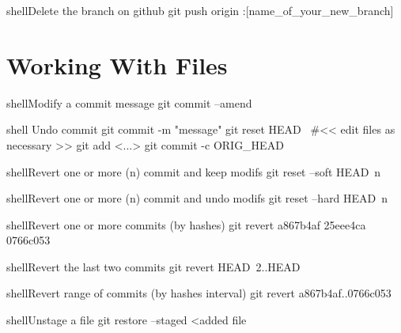 \documentclass[10pt,a4paper]{article}
\begin{document}
\begin{multicols}{3}
\begin{codebox}{shell}{Delete the branch on github}
git push origin :[name_of_your_new_branch]

\end{codebox}

\section{Working With Files}

\begin{codebox}{shell}{Modify a commit message}
git commit --amend

\end{codebox}

\begin{codebox}{shell}{}
Undo commit
git commit -m "message"
git reset HEAD~
#<< edit files as necessary >>
git add <...>
git commit -c ORIG_HEAD

\end{codebox}

\begin{codebox}{shell}{Revert one or more (n) commit and keep modifs}
git reset --soft HEAD~n

\end{codebox}

\begin{codebox}{shell}{Revert one or more (n) commit and undo modifs}
git reset --hard HEAD~n

\end{codebox}

\begin{codebox}{shell}{Revert one or more commits (by hashes)}
git revert a867b4af 25eee4ca 0766c053

\end{codebox}

\begin{codebox}{shell}{Revert the last two commits}
git revert HEAD~2..HEAD

\end{codebox}

\begin{codebox}{shell}{Revert range of commits (by hashes interval)}
git revert a867b4af..0766c053

\end{codebox}

\begin{codebox}{shell}{Unstage a file}
git restore --staged <added file

\end{codebox}


\end{multicols}
\end{document}
